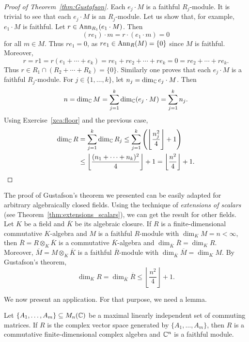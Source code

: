 \begin{proof}[Proof of Theorem~\ref{thm:Gustafson}]
    Each $e_j\cdot M$ is a faithful $R_j$-module. It is trivial to see that each 
    $e_j\cdot M$ is an $R_j$-module. 
    Let us show that, for example, $e_1\cdot M$ is faithful. Let $r\in\operatorname{Ann}_{R_1}(e_1\cdot M)$. Then
    \[
    (re_1)\cdot m=r\cdot (e_1\cdot m)=0
    \]
    for all $m\in M$. Thus $re_1=0$, as $re_1\in\operatorname{Ann}_R(M)=\{0\}$ since $M$ is faithful. Moreover, 
    \[
    r=r1=r(e_1+\cdots+e_k)=re_1+re_2+\cdots+re_k=0=re_2+\cdots+re_k.
    \]
    Thus $r\in R_1\cap (R_2+\cdots+R_k)=\{0\}$. Similarly one proves that each $e_j\cdot M$ is a faithful $R_j$-module. 
    For $j\in\{1,\dots,k\}$, let $n_j=\dim_{\mathbb{C}}e_j\cdot M$. Then 
    \[
    n=\dim_{\mathbb{C}}M=\sum_{j=1}^k\dim_{\mathbb{C}}(e_j\cdot M)=\sum_{j=1}^kn_j.
    \]
    Using Exercise~\ref{xca:floor} and the previous case, 
    \begin{align*}
    \dim_{\mathbb{C}}R&=\sum_{j=1}^k\dim_{\mathbb{C}}R_j
    \leq\sum_{j=1}^k \left(\left\lfloor \frac{n_j^2}{4}\right\rfloor+1\right)\\
    &\leq\left\lfloor\frac{(n_1+\cdots+n_k)^2}{4}\right\rfloor+1
    =\left\lfloor\frac{n^2}{4}\right\rfloor+1.\qedhere     
    \end{align*}
\end{proof}

The proof of Gustafson's theorem we presented 
can be easily adapted for arbitrary algebraically closed fields. Using the technique of \emph{extensions 
of scalars} (see Theorem~\ref{thm:extensions_scalars}), 
we can get the result for other fields. Let $K$ be a field and $\overline{K}$ be its algebraic closure. 
If $R$ is a finite-dimensional commutative 
$K$-algebra and $M$ is a faithful $R$-module with $\dim_KM=n<\infty$, then 
$\overline{R}=R\otimes_K\overline{K}$ is a commutative $\overline{K}$-algebra and
$\dim_{\overline{K}}\overline{R}=\dim_KR$. Moreover, $\overline{M}=M\otimes_K\overline{K}$ is a faithful
$\overline{R}$-module with 
$\dim_{\overline{K}}\overline{M}=\dim_KM$. By Gustafson's theorem, 
\[
\dim_KR=\dim_{\overline{K}}\overline{R}\leq\left\lfloor\frac{n^2}{4}\right\rfloor+1.
\]

We now present an application. For that purpose, we need a lemma.

\begin{lemma}
\label{lem:Gustafson}
    Let $\{A_1,\dots,A_m\}\subseteq M_n(\mathbb{C})$ be a maximal linearly independent set of
    commuting matrices. If $R$ is the complex vector space
    generated by $\{A_1,\dots,A_m\}$, then $R$ 
    is a commutative finite-dimensional complex 
    algebra and $\mathbb{C}^n$ is a faithful module. 
\end{lemma}

